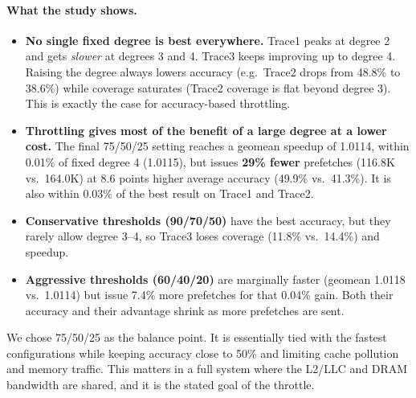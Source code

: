 \documentclass[11pt]{article}
\begin{document}
\paragraph{What the study shows.}
\begin{itemize}
  \item \textbf{No single fixed degree is best everywhere.} Trace1 peaks at degree 2 and gets
        \emph{slower} at degrees 3 and 4. Trace3 keeps improving up to degree 4. Raising the
        degree always lowers accuracy (e.g.\ Trace2 drops from 48.8\% to 38.6\%) while coverage
        saturates (Trace2 coverage is flat beyond degree 3). This is exactly the case for
        accuracy-based throttling.
  \item \textbf{Throttling gives most of the benefit of a large degree at a lower cost.} The final
        75/50/25 setting reaches a geomean speedup of 1.0114, within 0.01\% of fixed degree 4
        (1.0115), but issues \textbf{29\% fewer} prefetches (116.8K vs.\ 164.0K) at 8.6 points
        higher average accuracy (49.9\% vs.\ 41.3\%). It is also within 0.03\% of the best
        result on Trace1 and Trace2.
  \item \textbf{Conservative thresholds (90/70/50)} have the best accuracy, but they rarely
        allow degree 3--4, so Trace3 loses coverage (11.8\% vs.\ 14.4\%) and speedup.
  \item \textbf{Aggressive thresholds (60/40/20)} are marginally faster (geomean 1.0118 vs.\ 1.0114)
        but issue 7.4\% more prefetches for that 0.04\% gain. Both their accuracy and their
        advantage shrink as more prefetches are sent.
\end{itemize}
We chose 75/50/25 as the balance point. It is essentially tied with the fastest
configurations while keeping accuracy close to 50\% and limiting cache pollution and memory
traffic. This matters in a full system where the L2/LLC and DRAM bandwidth are shared, and
it is the stated goal of the throttle.
\end{document}
